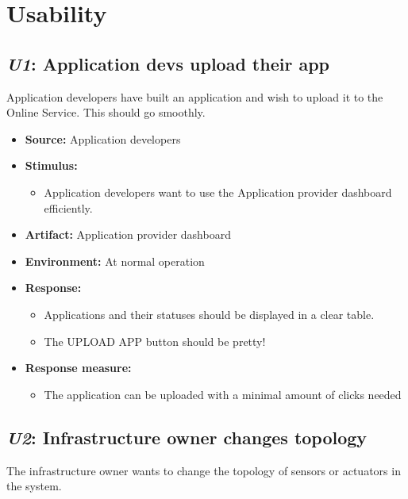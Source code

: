 \documentclass[english]{sareport}
\begin{document}
\section{Usability}
\subsection{\emph{U1}: Application devs upload their app}
Application developers have built an application and wish to upload it to
the Online Service. This should go smoothly.

\begin{itemize}
    \item \textbf{Source:} Application developers
    \item \textbf{Stimulus:}
        \begin{itemize}
            \item Application developers want to use the Application provider
                  dashboard efficiently.
        \end{itemize}

    \item \textbf{Artifact:} Application provider dashboard
    \item \textbf{Environment:} At normal operation
    \item \textbf{Response:}
        \begin{itemize}
            \item Applications and their statuses should be displayed in a clear table.
            \item The UPLOAD APP button should be pretty!
        \end{itemize}

    \item \textbf{Response measure:}
        \begin{itemize}
            \item The application can be uploaded with a minimal amount of clicks needed

        \end{itemize}
\end{itemize}

\subsection{\emph{U2}: Infrastructure owner changes topology}
The infrastructure owner wants to change the topology of sensors or actuators
in the system.
\end{document}
